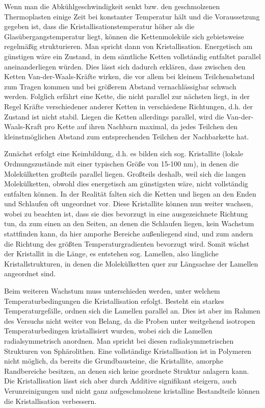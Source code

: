\documentclass[bigchapter,colorback,accentcolor=tud4b,linedtoc,11pt]{tudreport}
\begin{document}
Wenn man die Abkühlgeschwindigkeit senkt bzw. den geschmolzenen Thermoplasten einige Zeit bei konstanter Temperatur hält und die Voraussetzung gegeben ist, dass die Kristallisationstemperatur höher als die Glasübergangstemperatur liegt, können die Kettenmoleküle sich gebietsweise regelmäßig strukturieren. Man spricht dann von Kristallisation. Energetisch am günstigen wäre ein Zustand, in dem sämtliche Ketten vollständig entfaltet parallel aneinanderliegen würden. Dies lässt sich dadurch erklären, dass zwischen den Ketten Van-der-Waals-Kräfte wirken, die vor allem bei kleinem Teilchenabstand zum Tragen kommen und bei größerem Abstand vernachlässigbar schwach werden. Folglich erfährt eine Kette, die nicht parallel zur nächsten liegt, in der Regel Kräfte verschiedener anderer Ketten in verschiedene Richtungen, d.h. der Zustand ist nicht stabil. Liegen die Ketten allerdings parallel, wird die Van-der-Waals-Kraft pro Kette auf ihren Nachbarn maximal, da jedes Teilchen den kleinstmöglichen Abstand zum entsprechenden Teilchen der Nachbarkette hat.

Zunächst erfolgt eine Keimbildung, d.h. es bilden sich sog. Kristallite (lokale Ordnungszustände mit einer typischen Größe von 15-100 nm), in denen die Molekülketten großteils parallel liegen. Großteils deshalb, weil sich die langen Molekülketten, obwohl dies energetisch am günstigsten wäre, nicht vollständig entfalten können. In der Realität falten sich die Ketten und liegen an den Enden und Schlaufen oft ungeordnet vor. Diese Kristallite können nun weiter wachsen, wobei zu beachten ist, dass sie dies bevorzugt in eine ausgezeichnete Richtung tun, da zum einen an den Seiten, an denen die Schlaufen liegen, kein Wachstum stattfinden kann, da hier amporhe Bereiche außenliegend sind, und zum andern die Richtung des größten Temperaturgradienten bevorzugt wird. Somit wächst der Kristallit in die Länge, es entstehen sog. Lamellen, also längliche Kristallstrukturen, in denen die Molekülketten quer zur Längsachse der Lamellen angeordnet sind.

Beim weiteren Wachstum muss unterschieden werden, unter welchem Temperaturbedingungen die Kristallisation erfolgt. Besteht ein starkes Temperaturgefälle, ordnen sich die Lamellen parallel an. Dies ist aber im Rahmen des Versuchs nicht weiter von Belang, da die Proben unter weitgehend isotropen Temperaturbedingen kristallisiert wurden, wobei sich die Lamellen radialsymmetrisch anordnen. Man spricht bei diesen radialsymmetrischen Strukturen von Sphärolithen. Eine vollständige Kristallisation ist in Polymeren nicht möglich, da bereits die Grundbausteine, die Kristallite, amorphe Randbereiche besitzen, an denen sich keine geordnete Struktur anlagern kann. Die Kristallisation lässt sich aber durch Additive signifikant steigern, auch Verunreinigungen und nicht ganz aufgeschmolzene kristalline Bestandteile können die Kristallisation verbessern.
\end{document}
